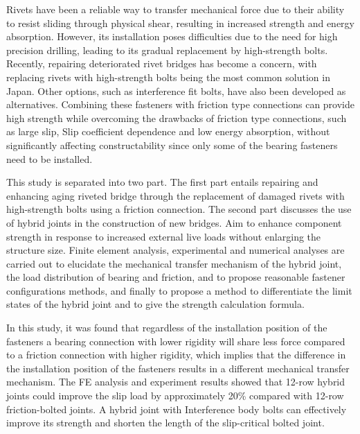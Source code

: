 \onehalfspacing 

Rivets have been a reliable way to transfer mechanical force due to their ability to resist sliding through physical shear, resulting in increased strength and energy absorption. However, its installation poses difficulties due to the need for high precision drilling, leading to its gradual replacement by high-strength bolts. Recently, repairing deteriorated rivet bridges has become a concern, with replacing rivets with high-strength bolts being the most common solution in Japan. Other options, such as interference fit bolts, have also been developed as alternatives. Combining these fasteners with friction type connections can provide high strength while overcoming the drawbacks of friction type connections, such as large slip, Slip coefficient dependence and low energy absorption, without significantly affecting constructability since only some of the bearing fasteners need to be installed.

This study is separated into two part. The first part entails repairing and enhancing aging riveted bridge through the replacement of damaged rivets with high-strength bolts using a friction connection. The second part discusses the use of hybrid joints in the construction of new bridges. Aim to enhance component strength in response to increased external live loads without enlarging the structure size. Finite element analysis, experimental and numerical analyses are carried out to elucidate the mechanical transfer mechanism of the hybrid joint, the load distribution of bearing and friction, and to propose reasonable fastener configurations methods, and finally to propose a method to differentiate the limit states of the hybrid joint and to give the strength calculation formula.

In this study, it was found that regardless of the installation position of the fasteners a bearing connection with lower rigidity will share less force compared to a friction connection with higher rigidity, which implies that the difference in the installation position of the fasteners results in a different mechanical transfer mechanism. The FE analysis and experiment results showed that 12-row hybrid joints could improve the slip load by approximately 20\% compared with 12-row friction-bolted joints. A hybrid joint with Interference body bolts can effectively improve its strength and shorten the length of the slip-critical bolted joint.

